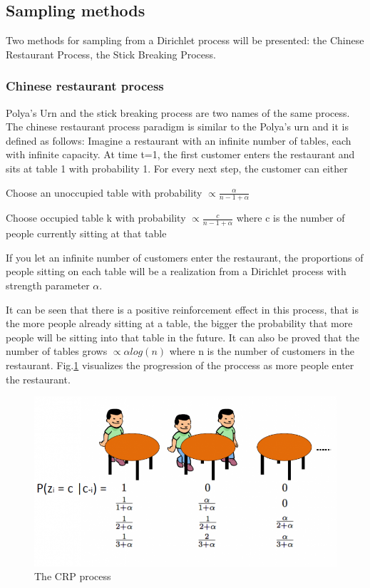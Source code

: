 \documentclass[twoside,hidelinks]{article}
\begin{document}
\subsection{Sampling methods}

Two methods for sampling from a Dirichlet process will be presented: the Chinese Restaurant Process, the Stick Breaking Process.


\subsubsection{Chinese restaurant process}
\label{sec:crp}
Polya's Urn and the stick breaking process are two names of the same process. The chinese restaurant process paradigm is similar to the Polya's urn and it is defined as follows:
Imagine a restaurant with an infinite number of tables, each with infinite capacity. At time t=1, the first customer enters the restaurant and sits at table 1 with probability 1. For every next step, the customer can either

\begin{compactitem}
	\item Choose an unoccupied table with probability $ \propto \frac{\alpha}{n-1+ \alpha }$
	\item Choose occupied table k with probability $ \propto  \frac{c}{n-1+ \alpha }$ where c is the number of people currently sitting at that table
\end{compactitem}


If you let an infinite number of customers enter the restaurant, the proportions of people sitting on each table will be a realization from a Dirichlet process with strength parameter $\alpha$.

It can be seen that there is a positive reinforcement effect in this process, that is the more people already sitting at a table, the bigger the probability that more people will be sitting into that table in the future. It can also be proved that the number of tables grows $ \propto \alpha log(n)$ where n is the number of customers in the restaurant. Fig.\ref{CRP} visualizes the progression of the proccess as more people enter the restaurant. 

\begin{figure}[!h]
          \centerline{\includegraphics[width=.70\textwidth]{crp}}
	\caption{The CRP process}
	\label{CRP}
\end{figure}
\end{document}
